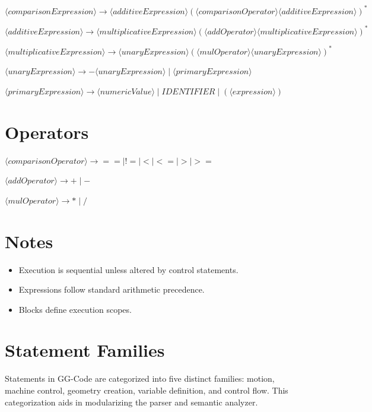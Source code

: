 \(
\langle comparisonExpression \rangle \rightarrow
\langle additiveExpression \rangle
(\langle comparisonOperator \rangle \langle additiveExpression \rangle)^*
\)

\(
\langle additiveExpression \rangle \rightarrow
\langle multiplicativeExpression \rangle
(\langle addOperator \rangle \langle multiplicativeExpression \rangle)^*
\)

\(
\langle multiplicativeExpression \rangle \rightarrow
\langle unaryExpression \rangle
(\langle mulOperator \rangle \langle unaryExpression \rangle)^*
\)

\(
\langle unaryExpression \rangle \rightarrow
- \langle unaryExpression \rangle
\mid \langle primaryExpression \rangle
\)

\(
\langle primaryExpression \rangle \rightarrow
\langle numericValue \rangle
\mid IDENTIFIER
\mid ( \langle expression \rangle )
\)

\section{Operators}

\(
\langle comparisonOperator \rangle \rightarrow == \mid != \mid < \mid <= \mid > \mid >=
\)

\(
\langle addOperator \rangle \rightarrow + \mid -
\)

\(
\langle mulOperator \rangle \rightarrow * \mid /
\)

\section{Notes}

\begin{itemize}
    \item Execution is sequential unless altered by control statements.
    \item Expressions follow standard arithmetic precedence.
    \item Blocks define execution scopes.
\end{itemize}

\section{Statement Families}
Statements in GG-Code are categorized into five distinct families: motion, machine control, geometry creation, variable definition, and control flow. This categorization aids in modularizing the parser and semantic analyzer.

